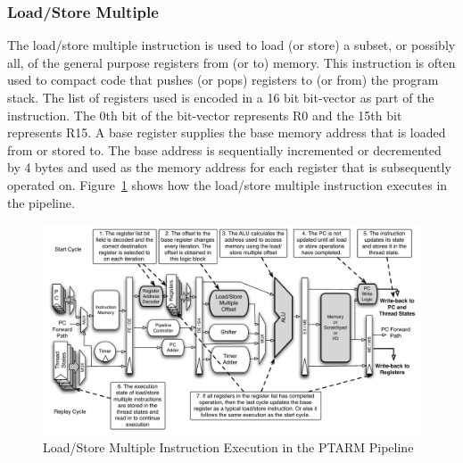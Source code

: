 \subsubsection{Load/Store Multiple}
The load/store multiple instruction is used to load (or store) a subset, or possibly all, of the general purpose registers from (or to) memory.
This instruction is often used to compact code that pushes (or pops) registers to (or from) the program stack.
The list of registers used is encoded in a 16 bit bit-vector as part of the instruction.
The 0th bit of the bit-vector represents R0 and the 15th bit represents R15.
A base register supplies the base memory address that is loaded from or stored to.
The base address is sequentially incremented or decremented by 4 bytes and used as the memory address for each register that is subsequently operated on. 
Figure~\ref{fig:ldstrm_pipeline_implementation} shows how the load/store multiple instruction executes in the pipeline. 

\begin{figure}[h]
  
  \begin{center}
    \includegraphics[scale=.54]{figs/ldstrm_pipeline_implementation}
  \end{center}
  \vspace{-3mm}
  \caption{Load/Store Multiple Instruction Execution in the PTARM Pipeline}
  \label{fig:ldstrm_pipeline_implementation}
\end{figure}

